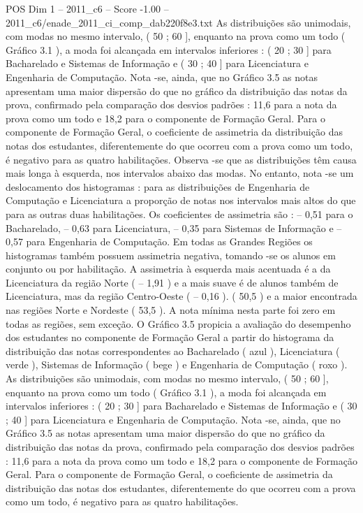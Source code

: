 \begin{textsample}{POS Dim 1 – 2011\_c6 – Score -1.00 – 2011\_c6/enade\_2011\_ci\_comp\_dab220f8e3.txt}
As distribuições são unimodais, com modas no mesmo intervalo, ( 50 ; 60 ], enquanto na prova como um todo ( Gráfico 3.1 ), a moda foi alcançada em intervalos inferiores : ( 20 ; 30 ] para Bacharelado e Sistemas de Informação e ( 30 ; 40 ] para Licenciatura e Engenharia de Computação.
Nota -se, ainda, que no Gráfico 3.5 as notas apresentam uma maior dispersão do que no gráfico da distribuição das notas da prova, confirmado pela comparação dos desvios padrões : 11,6 para a nota da prova como um todo e 18,2 para o componente de Formação Geral.
Para o componente de Formação Geral, o coeficiente de assimetria da distribuição das notas dos estudantes, diferentemente do que ocorreu com a prova como um todo, é negativo para as quatro habilitações.
Observa -se que as distribuições têm causa mais longa à esquerda, nos intervalos abaixo das modas.
No entanto, nota -se um deslocamento dos histogramas : para as distribuições de Engenharia de Computação e Licenciatura a proporção de notas nos intervalos mais altos do que para as outras duas habilitações.
Os coeficientes de assimetria são : – 0,51 para o Bacharelado, – 0,63 para Licenciatura, – 0,35 para Sistemas de Informação e – 0,57 para Engenharia de Computação.
Em todas as Grandes Regiões os histogramas também possuem assimetria negativa, tomando -se os alunos em conjunto ou por habilitação.
A assimetria à esquerda mais acentuada é a da Licenciatura da região Norte ( – 1,91 ) e a mais suave é de alunos também de Licenciatura, mas da região Centro-Oeste ( – 0,16 ). ( 50,5 ) e a maior encontrada nas regiões Norte e Nordeste ( 53,5 ).
A nota mínima nesta parte foi zero em todas as regiões, sem exceção.
O Gráfico 3.5 propicia a avaliação do desempenho dos estudantes no componente de Formação Geral a partir do histograma da distribuição das notas correspondentes ao Bacharelado ( azul ), Licenciatura ( verde ), Sistemas de Informação ( bege ) e Engenharia de Computação ( roxo ).
As distribuições são unimodais, com modas no mesmo intervalo, ( 50 ; 60 ], enquanto na prova como um todo ( Gráfico 3.1 ), a moda foi alcançada em intervalos inferiores : ( 20 ; 30 ] para Bacharelado e Sistemas de Informação e ( 30 ; 40 ] para Licenciatura e Engenharia de Computação.
Nota -se, ainda, que no Gráfico 3.5 as notas apresentam uma maior dispersão do que no gráfico da distribuição das notas da prova, confirmado pela comparação dos desvios padrões : 11,6 para a nota da prova como um todo e 18,2 para o componente de Formação Geral.
Para o componente de Formação Geral, o coeficiente de assimetria da distribuição das notas dos estudantes, diferentemente do que ocorreu com a prova como um todo, é negativo para as quatro habilitações.

\end{textsample}

